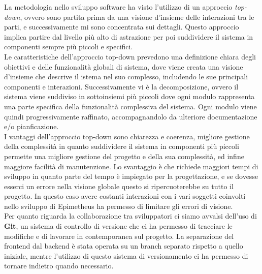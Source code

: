 La metodologia nello sviluppo software ha visto l'utilizzo di un approccio \textit{top-down}, ovvero sono partita prima da una visione d'insieme delle interazioni tra le parti, e successivamente mi sono concentrata sui dettagli. Questo approccio implica partire dal livello più alto di astrazione per poi suddividere il sistema in componenti sempre più piccoli e specifici. \\
Le caratteristiche dell'approccio top-down prevedono una definizione chiara degli obiettivi e delle funzionalità globali di sistema, dove viene creata una visione d'insieme che descrive il istema nel suo complesso, includendo le sue principali componenti e interazioni. Successivamente vi è la decomposizione, ovvero il sistema viene suddiviso in sottoinsiemi più piccoli dove ogni modulo rappresenta una parte specifica della funzionalità complessiva del sistema. Ogni modulo viene quindi progressivamente raffinato, accompagnandolo da ulteriore documentazione e/o pianficazione. \\
I vantaggi dell'approccio top-down sono chiarezza e coerenza, migliore gestione della complessità in quanto suddividere il sistema in componenti più piccoli permette una migliore gestione del progetto e della sua complessità, ed infine maggiore facilità di manutenzione. Lo svantaggio è che richiede maggiori tempi di sviluppo in quanto parte del tempo è impiegato per la progettazione, e se dovesse esserci un errore nella visione globale questo si ripercuoterebbe su tutto il progetto. In questo caso avere costanti interazioni con i vari soggetti coinvolti nello sviluppo di Epimetheus ha permesso di limitare gli errori di visione.\\

Per quanto riguarda la collaborazione tra sviluppatori ci siamo avvalsi dell'uso di \textbf{Git}, un sistema di controllo di versione che ci ha permesso di tracciare le modifiche e di lavorare in contemporanea sul progetto. La separazione del frontend dal backend è stata operata su un branch separato rispetto a quello iniziale, mentre l'utilizzo di questo sistema di versionamento ci ha permesso di tornare indietro quando necessario.


